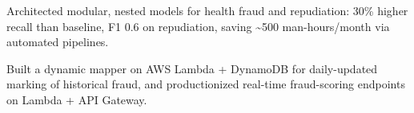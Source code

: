 \item Architected modular, nested models for health fraud and repudiation: 30\% higher recall than baseline, F1 0.6 on repudiation, saving \textasciitilde500 man-hours/month via automated pipelines.
\item Built a dynamic mapper on AWS Lambda + DynamoDB for daily-updated marking of historical fraud, and productionized real-time fraud-scoring endpoints on Lambda + API Gateway.
